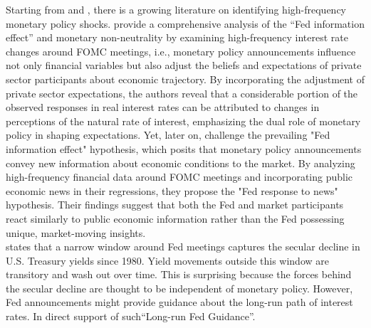 Starting from \citet{romer2004new} and \citet{gurkaynak2005}, there is a growing literature on identifying high-frequency monetary policy shocks. \citet{nakamura2018high} provide a comprehensive analysis of the ``Fed information effect'' and monetary non-neutrality by examining high-frequency interest rate changes around FOMC meetings, i.e., monetary policy announcements influence not only financial variables but also adjust the beliefs and expectations of private sector participants about economic trajectory. By incorporating the adjustment of private sector expectations, the authors reveal that a considerable portion of the observed responses in real interest rates can be attributed to changes in perceptions of the natural rate of interest, emphasizing the dual role of monetary policy in shaping expectations. Yet, later on, \citet{bauer2023alternative} challenge the prevailing "Fed information effect" hypothesis, which posits that monetary policy announcements convey new information about economic conditions to the market. By analyzing high-frequency financial data around FOMC meetings and incorporating public economic news in their regressions, they propose the "Fed response to news" hypothesis. Their findings suggest that both the Fed and market participants react similarly to public economic information rather than the Fed possessing unique, market-moving insights. \\

\citet{hillenbrand2022} states that a narrow window around Fed meetings captures the secular decline in U.S. Treasury yields since 1980. Yield movements outside this window are transitory and wash out over time. This is surprising because the forces behind the secular decline are thought to be independent of monetary policy. However, Fed announcements might provide guidance about the long-run path of interest rates. In direct support of such“Long-run Fed Guidance”. \\


